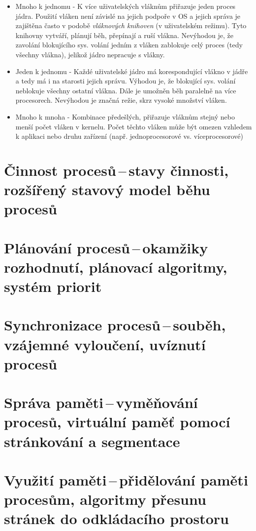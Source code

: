 \begin{itemize}
    \item Mnoho k jednomu - K více uživatelských vláknům přiřazuje jeden proces jádra. Použití vláken není závislé na jejich podpoře v OS a jejich správa je zajištěna často v podobě \textit{vláknových knihoven} (v uživatelském režimu). Tyto knihovny vytváří, plánují běh, přepínají a ruší vlákna. Nevýhodou je, že zavolání blokujícího sys. volání jedním z vláken zablokuje celý proces (tedy všechny vlákna), jelikož jádro nepracuje s vlákny.  
    \item Jeden k jednomu - Každé uživatelské jádro má korespondující vlákno v jádře a tedy má i na starosti jejich správu. Výhodou je, že blokující sys. volání neblokuje všechny ostatní vlákna. Dále je umožněn běh paralelně na více procesorech. Nevýhodou je značná režie, skrz vysoké množství vláken.
    \item Mnoho k mnoha - Kombinace předešlých, přiřazuje vláknům stejný nebo menší počet vláken v kernelu. Počet těchto vláken může být omezen vzhledem k aplikaci nebo druhu zařízení (např. jednoprocesorové vs. víceprocesorové)
\end{itemize}

\newpage
\section{Činnost procesů\,--\,stavy činnosti, rozšířený stavový model běhu procesů}

\newpage
\section{Plánování procesů\,--\,okamžiky rozhodnutí, plánovací algoritmy, systém priorit}

\newpage
\section{Synchronizace procesů\,--\,souběh, vzájemné vyloučení, uvíznutí procesů} \label{sync}

\newpage
\section{Správa paměti\,--\,vyměňování procesů, virtuální paměť pomocí stránkování a segmentace}

\newpage
\section{Využití paměti\,--\,přidělování paměti procesům, algoritmy přesunu stránek do odkládacího prostoru}

